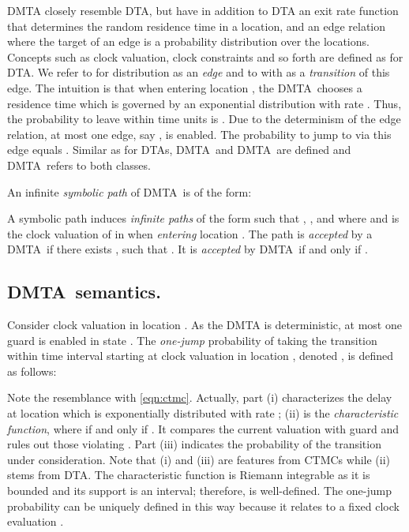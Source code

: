 \documentclass{LMCS}
\newcommand{\<}{\langle}
\renewcommand{\>}{\rangle}
\newcommand{\CTMC}{\textsc{{CTMC}}}
\newcommand{\DTA}{\textsc{DTA}}
\newcommand{\DMTAr}{\DMTA}
\newcommand{\DMTAo}{\DMTA}
\newcommand{\DMTA}{\textsc{DMTA}}
\begin{document}
DMTA closely resemble DTA, but have in addition to DTA an exit rate function
that determines the random residence time in a location, and an edge relation
where the target of an edge is a probability distribution over the locations.
Concepts such as clock valuation, clock constraints and so forth are defined as
for \DTA.  We refer to  for distribution
 as an \emph{edge} and to  with  as a \emph{transition} of this edge.  The intuition
is that when entering location , the \DMTA\ chooses a residence time which
is governed by an exponential distribution with rate .  Thus, the
probability to leave  within  time units is .  Due to the
determinism of the edge relation, at most one edge, say , is enabled.  The probability to jump to  via this edge
equals .   Similar as for \DTA s, \DMTAr\ and \DMTAo\ are defined
and \DMTA\ refers to both classes.

\begin{defi}
An infinite \emph{symbolic path} of \DMTA\  is of the form:



A symbolic path induces \emph{infinite paths} of the form  such that , , and
 where  and
 is the clock valuation of  in  when
\emph{entering} location .
The path  is \emph{accepted} by a \DMTAr\ if there exists ,
such that . It is \emph{accepted} by
\DMTAo\ if and only if .
\end{defi}

\subsection*{\DMTA\ semantics. }
Consider clock valuation  in location .
As the DMTA is deterministic, at most one guard is enabled in state .
The \emph{one-jump} probability of taking the transition 
within time interval  starting at clock valuation  in location , denoted
, is defined as follows:

Note the resemblance with \eqref{eqn:ctmc}.
Actually, part (i) characterizes the delay  at location  which is exponentially
distributed with rate ; (ii) is the \emph{characteristic function}, where
 if and only if .
It compares the current valuation  with guard 
and rules out those violating .
Part (iii) indicates the probability of the transition under consideration.
Note that (i) and (iii) are features from \CTMC s while (ii) stems from \DTA.
The characteristic function  is Riemann integrable as it is bounded
and its support is an interval; therefore,  is well-defined.
The one-jump probability can be uniquely defined in this way because it relates to
a fixed clock evaluation .
\end{document}
